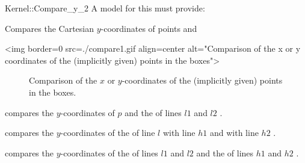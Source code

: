 \begin{ccRefFunctionObjectConcept}{Kernel::Compare_y_2}
A model for this must provide:


      {Compares the Cartesian $y$-coordinates of points  and
      }

\begin{ccHtmlOnly}
<img border=0 src=./compare1.gif align=center alt="Comparison of the x 
or y coordinates of the (implicitly given) points in the boxes">
\end{ccHtmlOnly} 

\begin{ccTexOnly}
\begin{figure}[h]
\centerline{}
\caption{Comparison of the $x$ or $y$-coordinates of the (implicitly
given) points in the boxes.\label{fig-compare14}}
\end{figure} 
\end{ccTexOnly} 


        {compares the $y$-coordinates of $p$ and the 
          of lines
         $l1$ and $l2$%
         .}


        {compares the $y$-coordinates of the  of line $l$
         with line $h1$ and with line $h2$%
         .}


        {compares the $y$-coordinates of the  of lines $l1$
         and $l2$ and  the  of lines $h1$ and $h2$ 
         .}


\end{ccRefFunctionObjectConcept}
